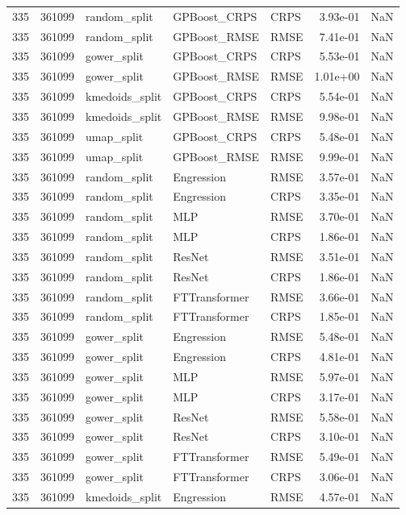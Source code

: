\begin{tabular}{rrlllrr}
335 & 361099 & random\_split & GPBoost\_CRPS & CRPS & 3.93e-01 & NaN \\
335 & 361099 & random\_split & GPBoost\_RMSE & RMSE & 7.41e-01 & NaN \\
335 & 361099 & gower\_split & GPBoost\_CRPS & CRPS & 5.53e-01 & NaN \\
335 & 361099 & gower\_split & GPBoost\_RMSE & RMSE & 1.01e+00 & NaN \\
335 & 361099 & kmedoids\_split & GPBoost\_CRPS & CRPS & 5.54e-01 & NaN \\
335 & 361099 & kmedoids\_split & GPBoost\_RMSE & RMSE & 9.98e-01 & NaN \\
335 & 361099 & umap\_split & GPBoost\_CRPS & CRPS & 5.48e-01 & NaN \\
335 & 361099 & umap\_split & GPBoost\_RMSE & RMSE & 9.99e-01 & NaN \\
335 & 361099 & random\_split & Engression & RMSE & 3.57e-01 & NaN \\
335 & 361099 & random\_split & Engression & CRPS & 3.35e-01 & NaN \\
335 & 361099 & random\_split & MLP & RMSE & 3.70e-01 & NaN \\
335 & 361099 & random\_split & MLP & CRPS & 1.86e-01 & NaN \\
335 & 361099 & random\_split & ResNet & RMSE & 3.51e-01 & NaN \\
335 & 361099 & random\_split & ResNet & CRPS & 1.86e-01 & NaN \\
335 & 361099 & random\_split & FTTransformer & RMSE & 3.66e-01 & NaN \\
335 & 361099 & random\_split & FTTransformer & CRPS & 1.85e-01 & NaN \\
335 & 361099 & gower\_split & Engression & RMSE & 5.48e-01 & NaN \\
335 & 361099 & gower\_split & Engression & CRPS & 4.81e-01 & NaN \\
335 & 361099 & gower\_split & MLP & RMSE & 5.97e-01 & NaN \\
335 & 361099 & gower\_split & MLP & CRPS & 3.17e-01 & NaN \\
335 & 361099 & gower\_split & ResNet & RMSE & 5.58e-01 & NaN \\
335 & 361099 & gower\_split & ResNet & CRPS & 3.10e-01 & NaN \\
335 & 361099 & gower\_split & FTTransformer & RMSE & 5.49e-01 & NaN \\
335 & 361099 & gower\_split & FTTransformer & CRPS & 3.06e-01 & NaN \\
335 & 361099 & kmedoids\_split & Engression & RMSE & 4.57e-01 & NaN \\

\end{tabular}
